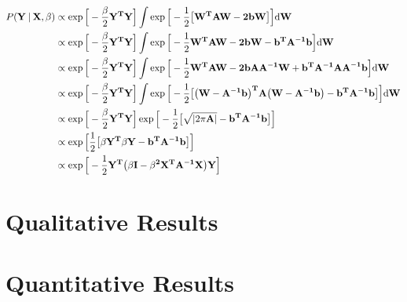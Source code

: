 \begin{align}
  \label{eqn:spp_gp_complete}
  P(\bf{Y} \:\vert\: \bf{X}, \beta) &\propto \exp{\Big[ -\frac{\beta}{2}\bf{Y}^{T}\bf{Y} \Big]}
  \int \exp{\Big[ -\frac{1}{2} 
  \big[
    \bf{W}^{T}\bf{AW} - 2\bf{bW}  
  \big]
  \Big]} {\mathrm d{\bf{W}}}\\
  &\propto \exp{\Big[ -\frac{\beta}{2}\bf{Y}^{T}\bf{Y} \Big]}
  \int \exp{\Big[ 
    -\frac{1}{2} \bf{W}^{T}\bf{AW} 
    - 2\bf{bW} 
    - \bf{b}^{T}\bf{A}^{-1}\bf{b}  
  \Big]} {\mathrm d{\bf{W}}}\\
  &\propto \exp{\Big[ -\frac{\beta}{2}\bf{Y}^{T}\bf{Y} \Big]}
  \int \exp{\Big[ 
    -\frac{1}{2} \bf{W}^{T}\bf{AW} 
    - 2\bf{bA}\bf{A}^{-1}\bf{W}
    + \bf{b}^{T}\bf{A}^{-1}\bf{AA}^{-1}\bf{b}  
  \Big]} {\mathrm d{\bf{W}}}\\
  &\propto \exp{\Big[ -\frac{\beta}{2}\bf{Y}^{T}\bf{Y} \Big]}
  \int \exp{\Big[ -\frac{1}{2} \big[ 
      \big( \bf{W} - \bf{A}^{-1}\bf{b} \big)^{T}
      \bf{A}
      \big( \bf{W} - \bf{A}^{-1}\bf{b} \big)
      - \bf{b}^{T}\bf{A}^{-1}\bf{b}
    \big]
  \Big]} {\mathrm d{\bf{W}}}\\
  &\propto \exp{\Big[ -\frac{\beta}{2}\bf{Y}^{T}\bf{Y} \Big]}
  \exp{\Big[ -\frac{1}{2} \big[
      \sqrt{\left| 2 \pi \bf{A} \right|}
      - \bf{b}^{T}\bf{A}^{-1}\bf{b}
    \big]
  \Big]}\\
  &\propto \exp{\Big[ \frac{1}{2} \big[
    \beta \bf{Y}^{T}\beta{Y}
    - \bf{b}^{T}\bf{A}^{-1}\bf{b}
    \big]
  \Big]}\\
  &\propto \exp{\Big[ -\frac{1}{2}
  \bf{Y}^{T} \big(
    \beta \bf{I} - \beta^{2}\bf{X}^{T}\bf{A}^{-1}\bf{X}
    \big)\bf{Y}
  \Big]}\\
\end{align}

\section{Qualitative Results}
\label{sec:spp_qualitative}

\section{Quantitative Results}
\label{sec:spp_quantitative}